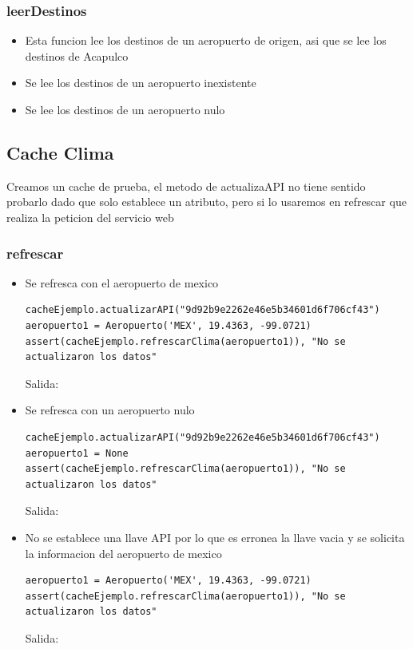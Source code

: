 \documentclass[12pt]{article}
\begin{document}
\subsubsection{leerDestinos}
\begin{itemize}
\item Esta funcion lee los destinos de un aeropuerto de origen, asi que se lee los destinos de Acapulco 
\item Se lee los destinos de un aeropuerto inexistente
\item Se lee los destinos de un aeropuerto nulo
\end{itemize}
\subsection{Cache Clima}
Creamos un cache de prueba, el metodo de actualizaAPI no tiene sentido probarlo dado que solo establece un atributo, pero si lo usaremos en refrescar que realiza la peticion del servicio web
\subsubsection{refrescar}
\begin{itemize}
\item Se refresca con el aeropuerto de mexico
\begin{verbatim}
cacheEjemplo.actualizarAPI("9d92b9e2262e46e5b34601d6f706cf43")
aeropuerto1 = Aeropuerto('MEX', 19.4363, -99.0721)
assert(cacheEjemplo.refrescarClima(aeropuerto1)), "No se actualizaron los datos"
\end{verbatim}
  Salida:
\item Se refresca con un aeropuerto nulo
\begin{verbatim}
cacheEjemplo.actualizarAPI("9d92b9e2262e46e5b34601d6f706cf43")
aeropuerto1 = None
assert(cacheEjemplo.refrescarClima(aeropuerto1)), "No se actualizaron los datos"
\end{verbatim}
  Salida:
\item No se establece una llave API por lo que es erronea la llave vacia y se solicita la informacion del aeropuerto de mexico
\begin{verbatim}
aeropuerto1 = Aeropuerto('MEX', 19.4363, -99.0721)
assert(cacheEjemplo.refrescarClima(aeropuerto1)), "No se actualizaron los datos"
\end{verbatim}
  Salida:
\end{itemize}
\end{document}
